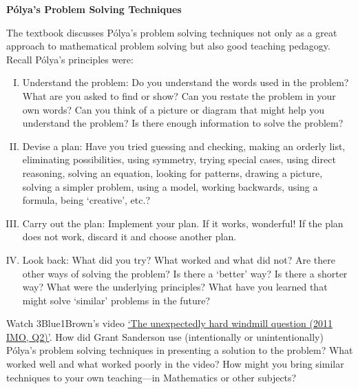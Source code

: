 \documentclass[11pt,letterpaper]{article}
\begin{document}

\begin{center} {\Large \bfseries P\'olya's Problem Solving Techniques} \end{center}

The textbook discusses P\'olya's problem solving techniques not only as a great approach to mathematical problem solving but also good teaching pedagogy. Recall P\'olya's principles were:
	\begin{enumerate}[I.]
	\item Understand the problem: Do you understand the words used in the problem? What are you asked to find or show? Can you restate the problem in your own words? Can you think of a picture or diagram that might help you understand the problem? Is there enough information to solve the problem?
	\item Devise a plan: Have you tried guessing and checking, making an orderly list, eliminating possibilities, using symmetry, trying special cases, using direct reasoning, solving an equation, looking for patterns, drawing a picture, solving a simpler problem, using a model, working backwards, using a formula, being `creative', etc.?
	\item Carry out the plan: Implement your plan. If it works, wonderful! If the plan does not work, discard it and choose another plan.
	\item Look back: What did you try? What worked and what did not? Are there other ways of solving the problem? Is there a `better' way? Is there a shorter way? What were the underlying principles? What have you learned that might solve `similar' problems in the future?
	\end{enumerate}

Watch 3Blue1Brown's video \href{https://www.youtube.com/watch?v=M64HUIJFTZM&ab_channel=3Blue1Brown}{`The unexpectedly hard windmill question (2011 IMO, Q2)'}. How did Grant Sanderson use (intentionally or unintentionally) P\'olya's problem solving techniques in presenting a solution to the problem? What worked well and what worked poorly in the video? How might you bring similar techniques to your own teaching---in Mathematics or other subjects?

\newpage

\phantom{.}
\end{document}
